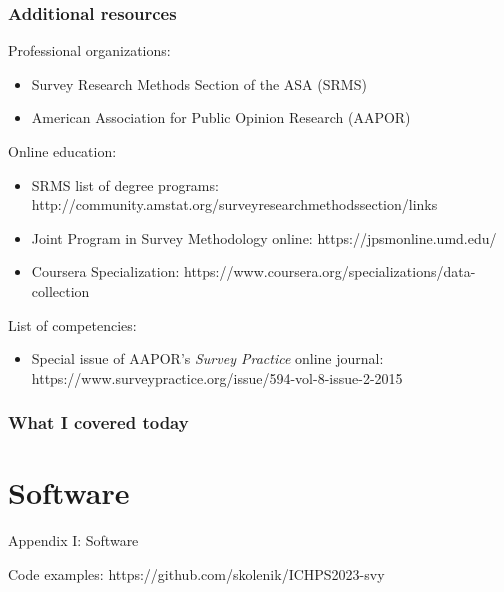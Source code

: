 \documentclass{beamer}
\begin{document}
\begin{frame}\frametitle{Additional resources}

Professional organizations:
\begin{itemize}
    \item Survey Research Methods Section of the ASA (SRMS)
    \item American Association for Public Opinion Research (AAPOR)
\end{itemize}

Online education:
\begin{itemize}
    \item SRMS list of degree programs: http://community.amstat.org/surveyresearchmethodssection/links
    \item Joint Program in Survey Methodology online: https://jpsmonline.umd.edu/
    \item Coursera Specialization: https://www.coursera.org/specializations/data-collection
\end{itemize}

List of competencies:
\begin{itemize}
    \item Special issue of AAPOR's \textit{Survey Practice} online journal: https://www.surveypractice.org/issue/594-vol-8-issue-2-2015
\end{itemize}

\end{frame}

\begin{frame}
    \frametitle{What I covered today}
    \tableofcontents
\end{frame}

\appendix

\section{Software}

\begin{frame}

\centering

{\Large Appendix I: Software}

\bigskip

\bigskip

Code examples: https://github.com/skolenik/ICHPS2023-svy

\end{frame}
\end{document}
